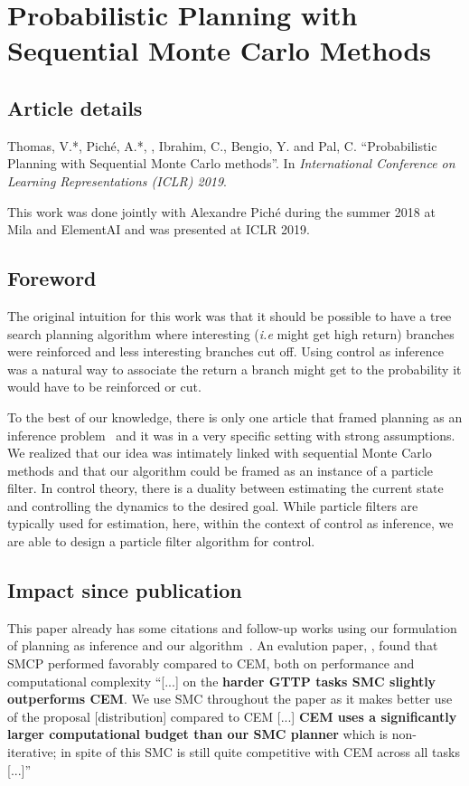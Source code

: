 \chapter{Probabilistic Planning with Sequential Monte Carlo Methods}
\label{chapter:smcp}
\section*{Article details}


Thomas, V.*, Piché, A.*, , Ibrahim, C., Bengio, Y. and Pal, C. ``Probabilistic Planning with Sequential Monte Carlo methods''. In \emph{International Conference on Learning Representations (ICLR) 2019}.

This work was done jointly with Alexandre Pich\'{e} during the summer 2018 at Mila and ElementAI and was presented at ICLR 2019. 
\section*{Foreword}
The original intuition for this work  was that it should be possible to have a tree search planning algorithm where interesting (\emph{i.e} might get high return) branches were reinforced and less interesting branches cut off. Using control as inference was a natural way to associate the return a branch might get to the probability it would have to be reinforced or cut.

To the best of our knowledge, there is only one article that framed planning as an inference problem~\citep{attias2003planning} and it was in a very specific setting with strong assumptions.
We realized that our idea was intimately linked with sequential Monte Carlo methods and that our algorithm could be framed as an instance of a particle filter.
In control theory, there is a duality between estimating the current state and controlling the dynamics to the desired goal. While particle filters are typically used for estimation, here, within the context of control as inference, we are able to design a particle filter algorithm for control.


\section*{Impact since publication}
This paper already has some citations and follow-up works using our formulation of planning as inference and our algorithm~\citep{wang2019dual, lioutas2022critic}. An evalution paper, \citep{byravan22eval}, found that SMCP performed favorably compared to CEM, both on performance and computational complexity
        ``[...] on the \textbf{harder GTTP tasks SMC slightly outperforms CEM}. We use SMC throughout the paper as it makes better use of the proposal [distribution] compared to CEM 
        [...]
        \textbf{CEM uses a significantly larger computational budget than our SMC planner} which is non-iterative; in spite of this SMC is still quite competitive with CEM across all tasks [...]''

